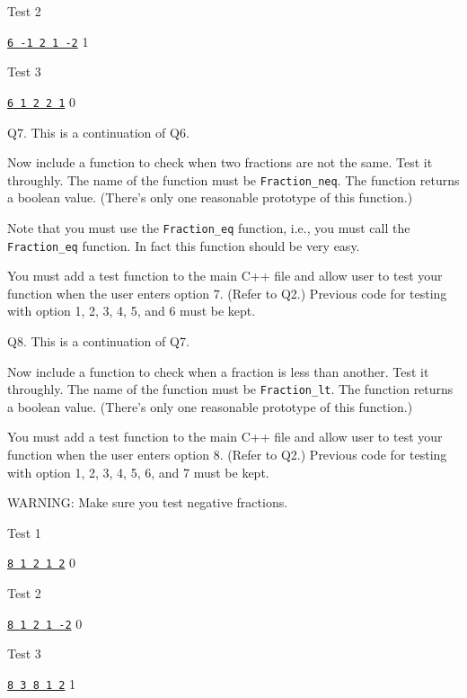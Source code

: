 Test 2
\begin{console}[commandchars=\\\{\}]
\underline{\texttt{6 -1 2 1 -2}}
1
\end{console}

Test 3
\begin{console}[commandchars=\\\{\}]
\underline{\texttt{6 1 2 2 1}}
0
\end{console}


\newpage
Q7.
This is a continuation of Q6.

Now include a function to check when two fractions are not the same.
Test it throughly.
The name of the function must be \verb!Fraction_neq!.
The function returns a boolean value.
(There's only one reasonable prototype of this function.)

Note that you must use the \verb!Fraction_eq! function, i.e.,
you must call the \verb!Fraction_eq! function.
In fact this function should be very easy.

You must add a test function to the main C++ file and allow user to test
your function when the user enters option 7. (Refer to Q2.)
Previous code for testing with option 1, 2, 3, 4, 5, and 6 must be kept.

\newpage
Q8.
This is a continuation of Q7.

Now include a function to check when a fraction is less than another.
Test it throughly.
The name of the function must be \verb!Fraction_lt!.
The function returns a boolean value.
(There's only one reasonable prototype of this function.)

You must add a test function to the main C++ file and allow user to test
your function when the user enters option 8. (Refer to Q2.)
Previous code for testing with option 1, 2, 3, 4, 5, 6, and 7 must be kept.

WARNING: Make sure you test negative fractions.

Test 1
\begin{console}[commandchars=\\\{\}]
\underline{\texttt{8 1 2 1 2}}
0
\end{console}

Test 2
\begin{console}[commandchars=\\\{\}]
\underline{\texttt{8 1 2 1 -2}}
0
\end{console}

Test 3
\begin{console}[commandchars=\\\{\}]
\underline{\texttt{8 3 8 1 2}}
1
\end{console}

